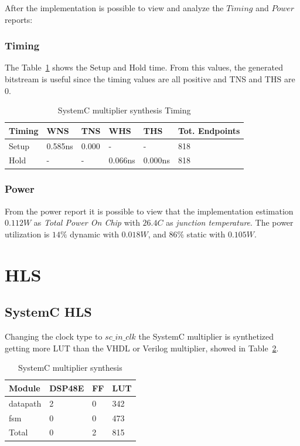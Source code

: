 \documentclass[]{IEEEtran}
\begin{document}
After the implementation is possible to view and analyze the $Timing$ and $Power$ reports:

\subsubsection{Timing}
The Table~\ref{tab:verilog_time} shows the Setup and Hold time. From this values, the generated bitstream is useful since the timing values are all positive and TNS and THS are 0.

\begin{table}[]
		\centering
	\begin{tabular}{@{}llllll@{}}
		\toprule
		Timing & WNS     & TNS   & WHS     & THS     & Tot. Endpoints \\ \midrule
		Setup  & 0.585ns & 0.000 & -       & -       & 818            \\
		Hold   & -       & -     & 0.066ns & 0.000ns & 818            \\ \bottomrule
	\end{tabular}
	\caption{SystemC multiplier synthesis Timing}
\label{tab:verilog_time}
\end{table}

\subsubsection{Power}
	From the power report it is possible to view that the implementation estimation $0.112W$ as \textit{Total Power On Chip} with $26.4 C$ as \textit{junction temperature}. The power utilization is $14\%$ dynamic with $0.018W$, and $86\%$ static with $0.105W$.
	
	\section{HLS}
	\label{sec:hls}
	\subsection{SystemC HLS}
	Changing the clock type to $sc\_in\_clk$ the SystemC multiplier is synthetized getting more LUT than the VHDL or Verilog multiplier, showed in Table~\ref{tab:systemc_sintesi}.
	\begin{table}[]
		\centering
		\begin{tabular}{@{}llll@{}}
			\toprule
			Module & DSP48E & FF & LUT  \\ \midrule
			datapath      & 2        & 0     & 342      \\
			fsm       & 0        & 0    & 473      \\
			Total      & 0          & 2       & 815      \\ \bottomrule
		\end{tabular}
		\caption{SystemC multiplier synthesis}
		\label{tab:systemc_sintesi}
	\end{table}
	
\end{document}

